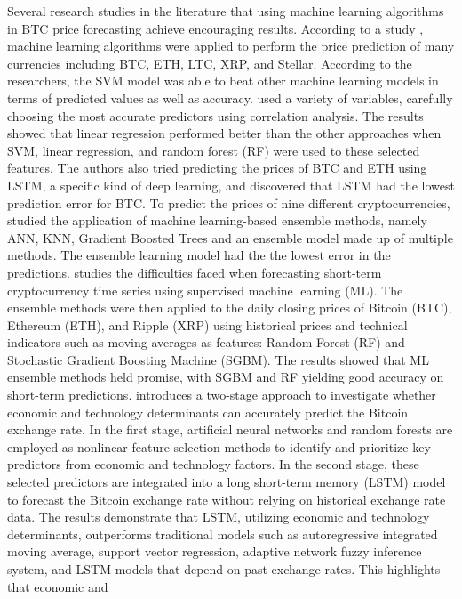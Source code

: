 \documentclass[]{interact}
\theoremstyle{plain}%
\theoremstyle{definition}
\theoremstyle{remark}
\begin{document}
Several research studies in the literature that using machine learning
algorithms in BTC price forecasting achieve encouraging results.
According to a study \citep{hitam2021}, machine learning algorithms were
applied to perform the price prediction of many currencies including
BTC, ETH, LTC, XRP, and Stellar. According to the researchers, the SVM
model was able to beat other machine learning models in terms of
predicted values as well as accuracy. \citep{saad19} used a variety of
variables, carefully choosing the most accurate predictors using
correlation analysis. The results showed that linear regression
performed better than the other approaches when SVM, linear regression,
and random forest (RF) were used to these selected features. The authors
also tried predicting the prices of BTC and ETH using LSTM, a specific
kind of deep learning, and discovered that LSTM had the lowest
prediction error for BTC. To predict the prices of nine different
cryptocurrencies, \citep{chowdhury20} studied the application of machine
learning-based ensemble methods, namely ANN, KNN, Gradient Boosted Trees
and an ensemble model made up of multiple methods. The ensemble learning
model had the the lowest error in the predictions. \citep{derbentsev21}
studies the difficulties faced when forecasting short-term
cryptocurrency time series using supervised machine learning (ML). The
ensemble methods were then applied to the daily closing prices of
Bitcoin (BTC), Ethereum (ETH), and Ripple (XRP) using historical prices
and technical indicators such as moving averages as features: Random
Forest (RF) and Stochastic Gradient Boosting Machine (SGBM). The results
showed that ML ensemble methods held promise, with SGBM and RF yielding
good accuracy on short-term predictions. \citep{chen2021} introduces a
two-stage approach to investigate whether economic and technology
determinants can accurately predict the Bitcoin exchange rate. In the
first stage, artificial neural networks and random forests are employed
as nonlinear feature selection methods to identify and prioritize key
predictors from economic and technology factors. In the second stage,
these selected predictors are integrated into a long short-term memory
(LSTM) model to forecast the Bitcoin exchange rate without relying on
historical exchange rate data. The results demonstrate that LSTM,
utilizing economic and technology determinants, outperforms traditional
models such as autoregressive integrated moving average, support vector
regression, adaptive network fuzzy inference system, and LSTM models
that depend on past exchange rates. This highlights that economic and
\end{document}
